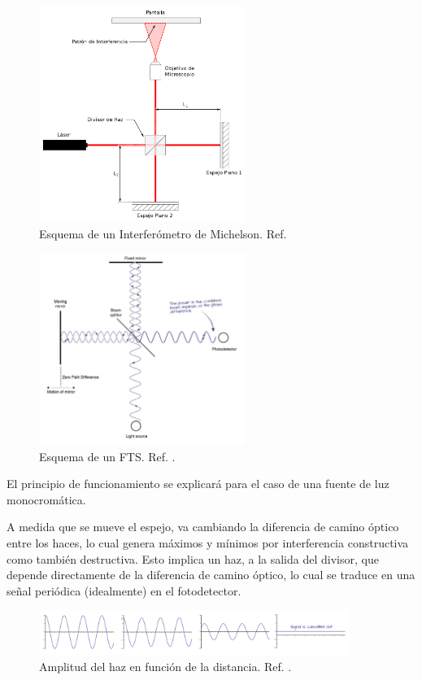 \documentclass[11pt,titlepage]{article}
\begin{document}
    \begin{figure}[htb!]
    \centering
    \includegraphics[width=0.6\textwidth]{fig/interferometroMichelson.png}
    \caption{Esquema de un Interferómetro de Michelson. Ref. \cite{Michelson}}
    \label{fig:Michelson}
\end{figure}

    \begin{figure}[ht!]
    \centering
    \includegraphics[width=0.6\textwidth]{fig/FTS.jpg}
    \caption{Esquema de un FTS. Ref. \cite{FTS}.}
    \label{fig:FTS}
\end{figure}

El principio de funcionamiento se explicará para el caso de una fuente de luz monocromática.\par
A medida que se mueve el espejo, va cambiando la diferencia de camino óptico entre los haces, lo cual genera máximos y mínimos por interferencia constructiva como también destructiva. Esto implica un haz, a la salida del divisor, que depende directamente de la diferencia de camino óptico, lo cual se traduce en una señal periódica (idealmente) en el fotodetector.\par
    \begin{figure}[ht!]
    \centering
    \includegraphics[width=0.9\textwidth]{fig/FTSmaxmin.png}
    \caption{Amplitud del haz en función de la distancia. Ref. \cite{FTS}.}
    \label{fig:InterfFTS}

\end{figure}
\end{document}
